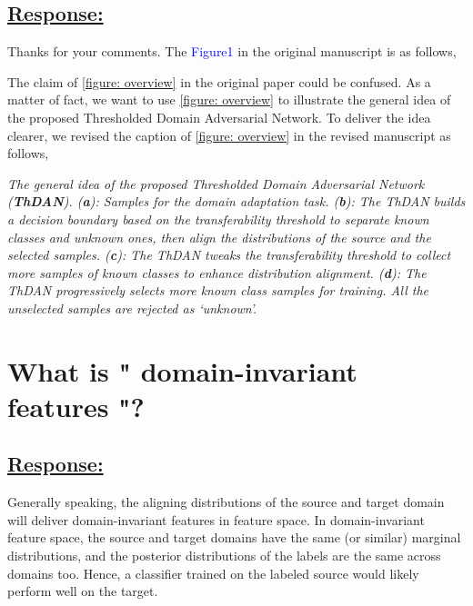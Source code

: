 \subsection*{\underline{\textbf{Response:}}}


Thanks for your comments. 
The \textcolor{blue}{Figure1} in the original manuscript is as follows,


The claim of \figurename{\ref{figure: overview}} in the original paper could be confused. 
As a matter of fact, we want to use \figurename{\ref{figure: overview}} to illustrate the general idea of the proposed Thresholded Domain Adversarial Network. 
To deliver the idea clearer, we revised the caption of \figurename{\ref{figure: overview}} in the revised manuscript as follows,
\begin{siderules}
    \textit{
        \footnotesize
        The general idea of the proposed Thresholded Domain Adversarial Network (\textit{\textbf{ThDAN}}). 
        (\textbf{a}): Samples for the domain adaptation task. 
        (\textbf{b}): The ThDAN builds a decision boundary based on the transferability threshold to separate known classes and unknown ones, then align the distributions of the source and the selected samples. 
        (\textbf{c}): The ThDAN tweaks the transferability threshold to collect more samples of known classes to enhance distribution alignment.
        (\textbf{d}): The ThDAN progressively selects more known class samples for training. 
        All the unselected samples are rejected as ‘unknown’.
    }
\end{siderules}


\section{
    What is " domain-invariant features "? 
}

\subsection*{\underline{\textbf{Response:}}}


Generally speaking, the aligning distributions of the source and target domain will deliver domain-invariant features in feature space. 
In domain-invariant feature space, the source and target domains have the same (or similar) marginal distributions, and the posterior distributions of the labels are the same across domains too. 
Hence, a classifier trained on the labeled source would likely perform well on the target. 


